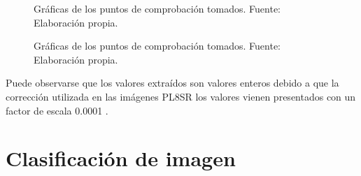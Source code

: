 \begin{figure}
\caption[Gráficas puntos de comprobación]{Gráficas de los puntos de comprobación tomados. Fuente: Elaboración propia.}
\label{fig:puntos_comprob}	
\end{figure}

\begin{figure}
\centering
{}
\caption[Gráficas puntos de comprobación]{Gráficas de los puntos de comprobación tomados. Fuente: Elaboración propia.}
\label{fig:puntos_comprob2}
\end{figure}

Puede observarse que los valores extraídos son valores enteros debido a que la corrección utilizada en las imágenes \ac{PL8SR} los valores vienen presentados con un factor de escala 0.0001 \citep{USGS2015}.

\section{Clasificación de imagen}
